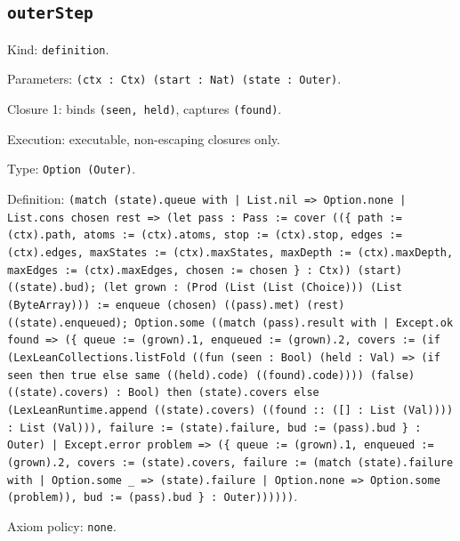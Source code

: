\documentclass[11pt]{article}
\begin{document}
\subsection*{\texttt{outerStep}}
\noindent Kind: \texttt{definition}.\par
\noindent Parameters: \texttt{(ctx : Ctx) (start : Nat) (state : Outer)}.\par
\noindent Closure 1: binds \texttt{(seen, held)}, captures \texttt{(found)}.\par
\noindent Execution: executable, non-escaping closures only.\par
\noindent Type: \texttt{Option (Outer)}.\par
\noindent Definition: \texttt{(match (state).queue with | List.nil => Option.none | List.cons chosen rest => (let pass : Pass := cover ((\{ path := (ctx).path, atoms := (ctx).atoms, stop := (ctx).stop, edges := (ctx).edges, maxStates := (ctx).maxStates, maxDepth := (ctx).maxDepth, maxEdges := (ctx).maxEdges, chosen := chosen \} : Ctx)) (start) ((state).bud); (let grown : (Prod (List (List (Choice))) (List (ByteArray))) := enqueue (chosen) ((pass).met) (rest) ((state).enqueued); Option.some ((match (pass).result with | Except.ok found => (\{ queue := (grown).1, enqueued := (grown).2, covers := (if (LexLeanCollections.listFold ((fun (seen : Bool) (held : Val) => (if seen then true else same ((held).code) ((found).code)))) (false) ((state).covers) : Bool) then (state).covers else (LexLeanRuntime.append ((state).covers) ((found :: ([] : List (Val)))) : List (Val))), failure := (state).failure, bud := (pass).bud \} : Outer) | Except.error problem => (\{ queue := (grown).1, enqueued := (grown).2, covers := (state).covers, failure := (match (state).failure with | Option.some \_ => (state).failure | Option.none => Option.some (problem)), bud := (pass).bud \} : Outer))))))}.\par
\noindent Axiom policy: \texttt{none}.\par
\end{document}
